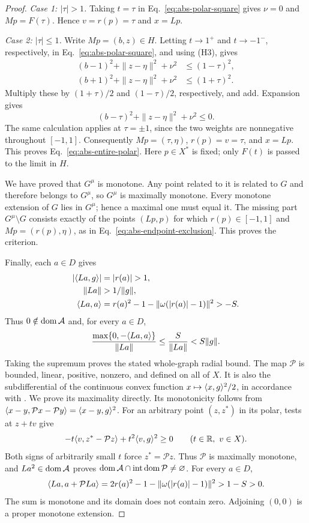 \begin{proof}
\emph{Case 1: $|\tau|>1$.}
Taking $t=\tau$ in Eq.~\eqref{eq:abs-polar-square} gives
$\nu=0$ and $Mp=F(\tau)$. Hence $v=r(p)=\tau$ and $x=Lp$.

\emph{Case 2: $|\tau|\le1$.}
Write $Mp=(b,z)\in H$. Letting $t\to1^+$ and $t\to-1^-$,
respectively, in Eq.~\eqref{eq:abs-polar-square}, and using
\textup{(H3)}, gives
\[
\begin{aligned}
(b-1)^2+\|z-\eta\|^2+\nu^2&\le(1-\tau)^2,\\
(b+1)^2+\|z-\eta\|^2+\nu^2&\le(1+\tau)^2.
\end{aligned}
\]
Multiply these by $(1+\tau)/2$ and $(1-\tau)/2$, respectively,
and add. Expansion gives
\[
(b-\tau)^2+\|z-\eta\|^2+\nu^2\le0.
\]
The same calculation applies at $\tau=\pm1$, since the two weights
are nonnegative throughout $[-1,1]$.
Consequently $Mp=(\tau,\eta)$, $r(p)=v=\tau$, and $x=Lp$.
This proves Eq.~\eqref{eq:abs-entire-polar}. Here $p\in X^*$ is fixed;
only $F(t)$ is passed to the limit in $H$.

We have proved that $G^\mu$ is monotone. Any point related to it
is related to $G$ and therefore belongs to $G^\mu$, so $G^\mu$
is maximally monotone. Every monotone extension of $G$ lies in
$G^\mu$; hence a maximal one must equal it. The missing part
$G^\mu\setminus G$ consists exactly of the points $(Lp,p)$ for which
$r(p)\in[-1,1]$ and $Mp=(r(p),\eta)$, as in
Eq.~\eqref{eq:abs-endpoint-exclusion}. This proves the criterion.

Finally, each $a\in D$ gives
\[
\begin{aligned}
|\pair{La}{g}|&=|r(a)|>1,\\
\|La\|&>1/\|g\|,\\
\pair{La}{a}&=r(a)^2-1-\|\omega(|r(a)|-1)\|^2>-S.
\end{aligned}
\]
Thus $0\notin\operatorname{dom}\mathcal A$ and, for every $a\in D$,
\[
\frac{\max\{0,-\langle La,a\rangle\}}{\|La\|}
\le\frac{S}{\|La\|}<S\|g\|.
\]
Taking the supremum proves the stated whole-graph radial bound.
The map $\mathcal P$ is bounded, linear, positive, nonzero, and
defined on all of $X$. It is also the subdifferential of the continuous
convex function $x\mapsto\langle x,g\rangle^2/2$, in accordance with
\cite{rockafellar1970subdiff}. We prove its maximality directly.
Its monotonicity follows from
$\langle x-y,\mathcal Px-\mathcal Py\rangle=\langle x-y,g\rangle^2$.
For an arbitrary point $(z,z^*)$ in its polar, tests at $z+tv$ give
\[
-t\langle v,z^*-\mathcal Pz\rangle+t^2\langle v,g\rangle^2\ge0
\qquad(t\in\mathbb R,\ v\in X).
\]
Both signs of arbitrarily small $t$ force $z^*=\mathcal Pz$.
Thus $\mathcal P$ is maximally monotone, and $La^2\in\operatorname{dom}\mathcal A$
proves $\operatorname{dom}\mathcal A\cap\operatorname{int}\operatorname{dom}\mathcal P\ne\varnothing$.
For every $a\in D$,
\[
\langle La,a+\mathcal PLa\rangle
=2r(a)^2-1-\|\omega(|r(a)|-1)\|^2>1-S>0.
\]
The sum is monotone and its domain does not contain zero. Adjoining $(0,0)$
is a proper monotone extension.
\end{proof}

